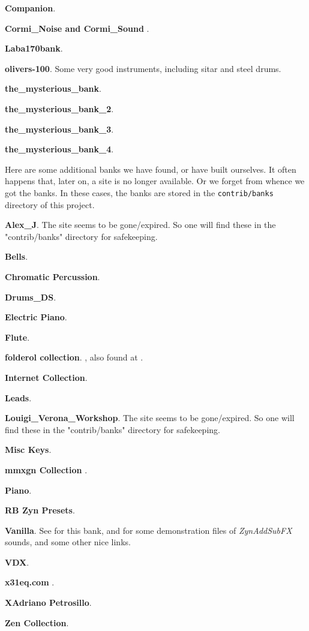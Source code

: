    \begin{enumber}
      \item \textbf{Companion}.
      \item \textbf{Cormi\_Noise and Cormi\_Sound} \cite{cormi}.
      \item \textbf{Laba170bank}.
      \item \textbf{olivers-100}.
         Some very good instruments, including sitar
         and steel drums.
      \item \textbf{the\_mysterious\_bank}.
      \item \textbf{the\_mysterious\_bank\_2}.
      \item \textbf{the\_mysterious\_bank\_3}.
      \item \textbf{the\_mysterious\_bank\_4}.
   \end{enumber}

   Here are some additional banks we have found, or have built ourselves.
   It often happens that, later on, a site is no longer available.
   Or we forget from whence we got the banks.
   In these cases, the banks are stored in the \texttt{contrib/banks}
   directory of this project.

   \begin{enumber}
      \item \textbf{Alex\_J}.
         The site seems to be gone/expired. So one will find these in the
         "contrib/banks" directory for safekeeping.
      \item \textbf{Bells}.
      \item \textbf{Chromatic Percussion}.
      \item \textbf{Drums\_DS}.
      \item \textbf{Electric Piano}.
      \item \textbf{Flute}.
      \item \textbf{folderol collection}.
         \cite{folderol}, also found at \cite{zyndemos}.
      \item \textbf{Internet Collection}.
      \item \textbf{Leads}.
      \item \textbf{Louigi\_Verona\_Workshop}.
         The site seems to be gone/expired. So one will find these in the
         "contrib/banks" directory for safekeeping.
      \item \textbf{Misc Keys}.
      \item \textbf{mmxgn Collection} \cite{mmxgn}.
      \item \textbf{Piano}.
      \item \textbf{RB Zyn Presets}.
      \item \textbf{Vanilla}.
         See \cite{zyndemos} for this bank, and for some demonstration files
         of \textsl{ZynAddSubFX} sounds, and some other nice links.
      \item \textbf{VDX}.
      \item \textbf{x31eq.com} \cite{x31eq}.
      \item \textbf{XAdriano Petrosillo}.
      \item \textbf{Zen Collection}.
   \end{enumber}

